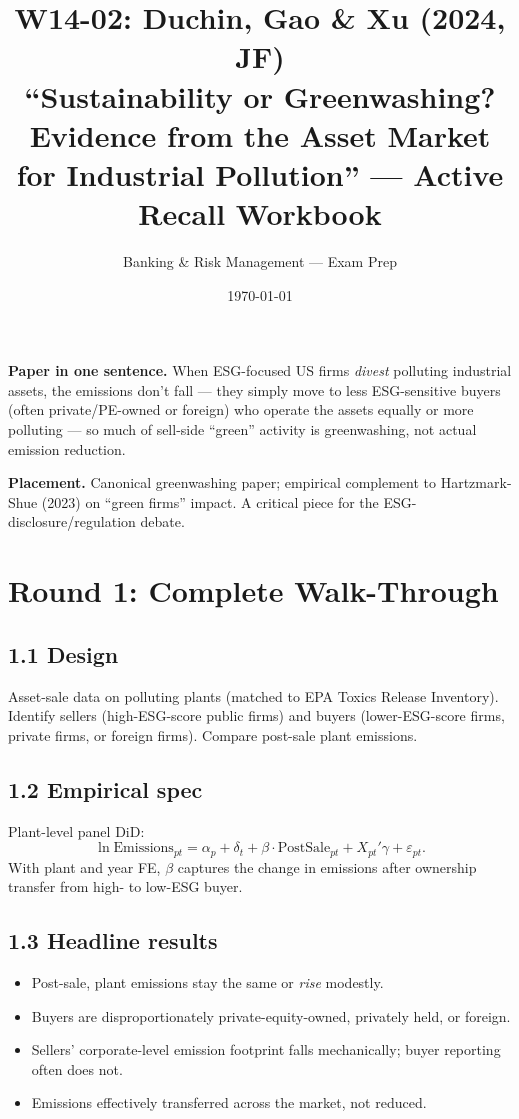 \documentclass[11pt]{article}
\title{W14-02: Duchin, Gao \& Xu (2024, JF) \\
\large ``Sustainability or Greenwashing? Evidence from the Asset Market for Industrial Pollution'' --- Active Recall Workbook}
\author{Banking \& Risk Management --- Exam Prep}
\date{\today}
\begin{document}
\maketitle

\begin{keybox}
\textbf{Paper in one sentence.} When ESG-focused US firms \emph{divest} polluting industrial assets, the emissions don't fall --- they simply move to less ESG-sensitive buyers (often private/PE-owned or foreign) who operate the assets equally or more polluting --- so much of sell-side ``green'' activity is greenwashing, not actual emission reduction.

\textbf{Placement.} Canonical greenwashing paper; empirical complement to Hartzmark-Shue (2023) on ``green firms'' impact. A critical piece for the ESG-disclosure/regulation debate.
\end{keybox}

\section*{Round 1: Complete Walk-Through}

\subsection*{1.1 Design}
Asset-sale data on polluting plants (matched to EPA Toxics Release Inventory). Identify sellers (high-ESG-score public firms) and buyers (lower-ESG-score firms, private firms, or foreign firms). Compare post-sale plant emissions.

\subsection*{1.2 Empirical spec}
Plant-level panel DiD:
\[
\ln\text{Emissions}_{pt}=\alpha_p+\delta_t+\beta\cdot\text{PostSale}_{pt}+X_{pt}'\gamma+\varepsilon_{pt}.
\]
With plant and year FE, $\beta$ captures the change in emissions after ownership transfer from high- to low-ESG buyer.

\subsection*{1.3 Headline results}
\begin{itemize}
\item Post-sale, plant emissions stay the same or \emph{rise} modestly.
\item Buyers are disproportionately private-equity-owned, privately held, or foreign.
\item Sellers' corporate-level emission footprint falls mechanically; buyer reporting often does not.
\item Emissions effectively transferred across the market, not reduced.
\end{itemize}
\end{document}
